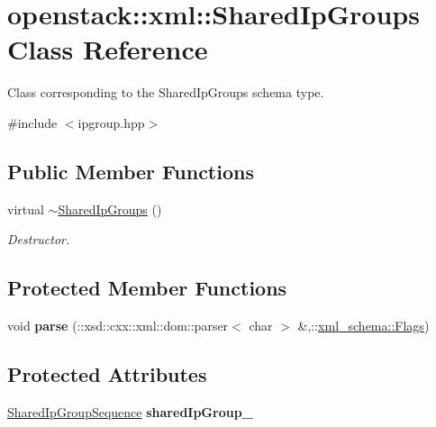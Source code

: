 \hypertarget{classopenstack_1_1xml_1_1SharedIpGroups}{
\section{openstack::xml::SharedIpGroups Class Reference}
\label{classopenstack_1_1xml_1_1SharedIpGroups}
}


Class corresponding to the SharedIpGroups schema type.  




{\ttfamily \#include $<$ipgroup.hpp$>$}

\subsection*{Public Member Functions}
\begin{DoxyCompactItemize}
\item 
\hypertarget{classopenstack_1_1xml_1_1SharedIpGroups_a0259df5efb366454a9620be2bd0871fb}{
virtual \hyperlink{classopenstack_1_1xml_1_1SharedIpGroups_a0259df5efb366454a9620be2bd0871fb}{$\sim$SharedIpGroups} ()}
\label{classopenstack_1_1xml_1_1SharedIpGroups_a0259df5efb366454a9620be2bd0871fb}

\begin{DoxyCompactList}\small\item\em Destructor. \item\end{DoxyCompactList}\end{DoxyCompactItemize}
\subsection*{Protected Member Functions}
\begin{DoxyCompactItemize}
\item 
\hypertarget{classopenstack_1_1xml_1_1SharedIpGroups_aaa7a36ede8259e57974d33e37d8ce50f}{
void {\bfseries parse} (::xsd::cxx::xml::dom::parser$<$ char $>$ \&,::\hyperlink{namespacexml__schema_affb4c227cbd9aa7453dd1dc5a1401943}{xml\_\-schema::Flags})}
\label{classopenstack_1_1xml_1_1SharedIpGroups_aaa7a36ede8259e57974d33e37d8ce50f}

\end{DoxyCompactItemize}
\subsection*{Protected Attributes}
\begin{DoxyCompactItemize}
\item 
\hypertarget{classopenstack_1_1xml_1_1SharedIpGroups_ad5f996cc605b30419302099c6f1591dc}{
\hyperlink{classopenstack_1_1xml_1_1SharedIpGroups_af021b83d8e3b8876b2aecc2c476e39e2}{SharedIpGroupSequence} {\bfseries sharedIpGroup\_\-}}
\label{classopenstack_1_1xml_1_1SharedIpGroups_ad5f996cc605b30419302099c6f1591dc}

\end{DoxyCompactItemize}
